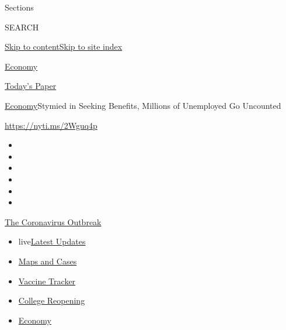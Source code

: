 Sections

SEARCH

\protect\hyperlink{site-content}{Skip to
content}\protect\hyperlink{site-index}{Skip to site index}

\href{https://www.nytimes3xbfgragh.onion/section/business/economy}{Economy}

\href{https://myaccount.nytimes3xbfgragh.onion/auth/login?response_type=cookie\&client_id=vi}{}

\href{https://www.nytimes3xbfgragh.onion/section/todayspaper}{Today's
Paper}

\href{/section/business/economy}{Economy}\textbar{}Stymied in Seeking
Benefits, Millions of Unemployed Go Uncounted

\url{https://nyti.ms/2Wguq4p}

\begin{itemize}
\item
\item
\item
\item
\item
\item
\end{itemize}

\href{https://www.nytimes3xbfgragh.onion/news-event/coronavirus?action=click\&pgtype=Article\&state=default\&region=TOP_BANNER\&context=storylines_menu}{The
Coronavirus Outbreak}

\begin{itemize}
\tightlist
\item
  live\href{https://www.nytimes3xbfgragh.onion/2020/08/04/world/coronavirus-cases.html?action=click\&pgtype=Article\&state=default\&region=TOP_BANNER\&context=storylines_menu}{Latest
  Updates}
\item
  \href{https://www.nytimes3xbfgragh.onion/interactive/2020/us/coronavirus-us-cases.html?action=click\&pgtype=Article\&state=default\&region=TOP_BANNER\&context=storylines_menu}{Maps
  and Cases}
\item
  \href{https://www.nytimes3xbfgragh.onion/interactive/2020/science/coronavirus-vaccine-tracker.html?action=click\&pgtype=Article\&state=default\&region=TOP_BANNER\&context=storylines_menu}{Vaccine
  Tracker}
\item
  \href{https://www.nytimes3xbfgragh.onion/2020/08/02/us/covid-college-reopening.html?action=click\&pgtype=Article\&state=default\&region=TOP_BANNER\&context=storylines_menu}{College
  Reopening}
\item
  \href{https://www.nytimes3xbfgragh.onion/live/2020/08/04/business/stock-market-today-coronavirus?action=click\&pgtype=Article\&state=default\&region=TOP_BANNER\&context=storylines_menu}{Economy}
\end{itemize}

